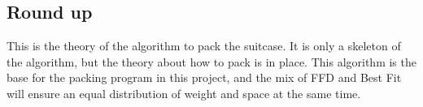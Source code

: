 \subsection{Round up}
This is the theory of the algorithm to pack the suitcase. It is only a skeleton of the algorithm, but the theory about how to pack is in place. This algorithm is the base for the packing program in this project, and the mix of FFD and Best Fit will ensure an equal distribution of weight and space at the same time. 